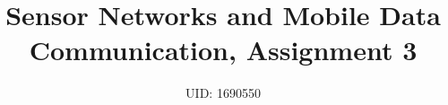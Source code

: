 \documentclass[11pt,journal]{article}
\begin{document}
	\title{Sensor Networks and Mobile Data Communication, Assignment 3}
	
	\author{UID: 1690550}%
	



	
	
	\maketitle
	
	
	
	
\end{document}
